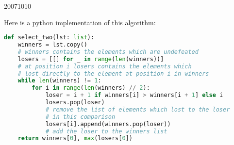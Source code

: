 \documentclass[10pt,\jkfside,a4paper]{article}
\begin{document}
\begin{examquestion}{2007}{10}{10}
\begin{enumerate}
Here is a python implementation of this algorithm:

\begin{lstlisting}[language=python]
def select_two(lst: list):
    winners = lst.copy()
    # winners contains the elements which are undefeated
    losers = [[] for _ in range(len(winners))]
    # at position i losers contains the elements which
    # lost directly to the element at position i in winners
    while len(winners) != 1:
        for i in range(len(winners) // 2):
            loser = i + 1 if winners[i] > winners[i + 1] else i
            losers.pop(loser)
            # remove the list of elements which lost to the loser
            # in this comparison
            losers[i].append(winners.pop(loser))
            # add the loser to the winners list
    return winners[0], max(losers[0])
\end{lstlisting}

\end{enumerate}

\end{examquestion}
\end{document}
